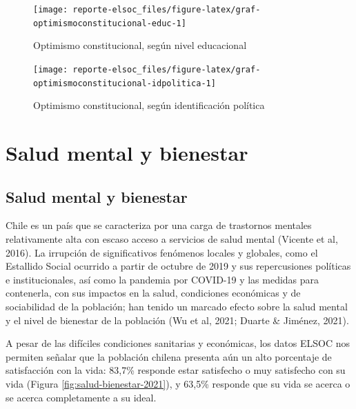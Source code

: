 \documentclass[
  12pt,
]{book}
\begin{document}
\begin{figure}

{\centering \texttt{[image: reporte-elsoc\_files/figure-latex/graf-optimismoconstitucional-educ-1]} 

}

\caption{Optimismo constitucional, según nivel educacional}\label{fig:graf-optimismoconstitucional-educ}
\end{figure}

\begin{figure}

{\centering \texttt{[image: reporte-elsoc\_files/figure-latex/graf-optimismoconstitucional-idpolitica-1]} 

}

\caption{Optimismo constitucional, según identificación política}\label{fig:graf-optimismoconstitucional-idpolitica}
\end{figure}

\hypertarget{salud-mental-y-bienestar}{%
\chapter{Salud mental y bienestar}\label{salud-mental-y-bienestar}}

\hypertarget{salud-mental-y-bienestar-1}{%
\section{Salud mental y bienestar}\label{salud-mental-y-bienestar-1}}

Chile es un país que se caracteriza por una carga de trastornos mentales relativamente alta con escaso acceso a servicios de salud mental (Vicente et al, 2016). La irrupción de significativos fenómenos locales y globales, como el Estallido Social ocurrido a partir de octubre de 2019 y sus repercusiones políticas e institucionales, así como la pandemia por COVID-19 y las medidas para contenerla, con sus impactos en la salud, condiciones económicas y de sociabilidad de la población; han tenido un marcado efecto sobre la salud mental y el nivel de bienestar de la población (Wu et al, 2021; Duarte \& Jiménez, 2021).

A pesar de las difíciles condiciones sanitarias y económicas, los datos ELSOC nos permiten señalar que la población chilena presenta aún un alto porcentaje de satisfacción con la vida: 83,7\% responde estar satisfecho o muy satisfecho con su vida (Figura \ref{fig:salud-bienestar-2021}), y 63,5\% responde que su vida se acerca o se acerca completamente a su ideal.
\end{document}
